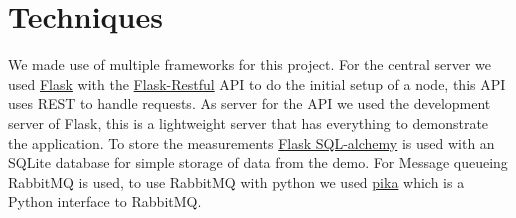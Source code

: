 \documentclass{article}
\begin{document}
\section{Techniques}
    We made use of multiple frameworks for this project. For the central server we used \href{http://flask.pocoo.org/}{Flask} with the \href{https://flask-restful.readthedocs.io/en/0.3.5/}{Flask-Restful} API to do the initial setup of a node, this API uses REST to handle requests. As server for the API we used the development server of Flask, this is a lightweight server that has everything to demonstrate the application. To store the measurements \href{http://flask-sqlalchemy.pocoo.org/2.1/}{Flask SQL-alchemy} is used with an SQLite database for simple storage of data from the demo.
    For Message queueing RabbitMQ is used, to use RabbitMQ with python we used \href{https://github.com/pika/pika}{pika} which is a Python interface to RabbitMQ. 
\end{document}
